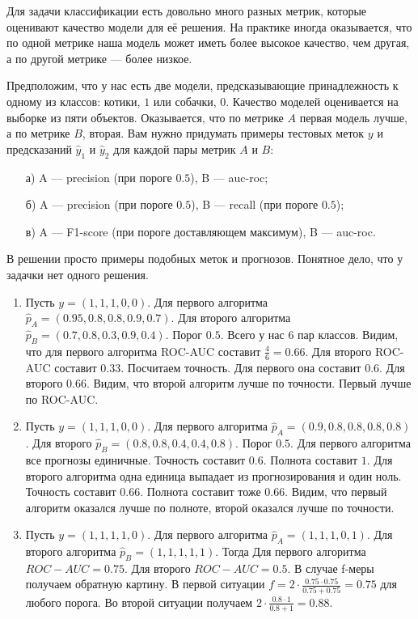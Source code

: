 \documentclass[12pt, a4paper, oneside]{article}
\theoremstyle{plain} %
\theoremstyle{definition}
\newcounter{problem}%
\renewcommand{\theproblem}{\arabic{problem}}
\newenvironment{problem}{
\addtocounter{problem}{1}\noindent{ \color{titleblue} \large \bfseries Упражнение~\theproblem \vspace{1ex} \newline}
}{ }
\begin{document}
\begin{problem}
Для задачи классификации есть довольно много разных метрик, которые оценивают качество модели для её решения. На практике иногда оказывается, что по одной метрике наша модель может иметь более высокое качество, чем другая, а по другой метрике --- более низкое. 

Предположим, что у нас есть две модели, предсказывающие принадлежность к одному из классов: котики, $1$ или собачки, $0$. Качество моделей оценивается на выборке из пяти объектов.  
Оказывается, что по метрике $A$ первая модель лучше, а по метрике $B$, вторая. Вам нужно придумать примеры тестовых меток $y$ и предсказаний $\hat y_1$ и $\hat y_2$ для каждой пары метрик $A$ и $B$: 

\begin{enumerate} 
\item[а)] A --- precision (при пороге $0.5$), B --- auc-roc;

\item[б)] A --- precision (при пороге $0.5$), B --- recall (при пороге $0.5$);

\item[в)] A --- F1-score (при пороге доставляющем максимум), B --- auc-roc.
\end{enumerate} 
\end{problem} 


\begin{solution} 
В решении просто примеры подобных меток и прогнозов. Понятное дело, что у задачки нет одного решения. 
\begin{enumerate}

	\item Пусть $y = (1,1,1,0,0)$. Для первого алгоритма $\hat p_A = (0.95, 0.8, 0.8, 0.9, 0.7)$. Для второго алгоритма $\hat p_B = (0.7, 0.8, 0.3, 0.9, 0.4)$. Порог $0.5$. Всего у нас $6$ пар классов. Видим, что для первого алгоритма ROC-AUC составит $\frac{4}{6} = 0.66$. Для второго ROC-AUC составит $0.33$.  Посчитаем точность. Для первого она составит $0.6$. Для второго $0.66$. Видим, что второй алгоритм лучше по точности. Первый лучше по ROC-AUC. 
	
	\item  Пусть $y = (1,1,1,0,0)$. Для первого алгоритма $\hat p_A = (0.9, 0.8, 0.8, 0.8, 0.8)$. Для второго $\hat p_B = (0.8,0.8,0.4,0.4,0.8)$.  Порог $0.5$. Для первого алгоритма все прогнозы единичные. Точность составит $0.6$. Полнота составит $1$. Для второго алгоритма одна единица выпадает из прогнозирования и один ноль. Точность составит $0.66$.  Полнота составит тоже $0.66$. Видим, что первый алгоритм оказался лучше по полноте, второй оказался лучше по точности.  
	
	\item  Пусть $y = (1,1,1,1,0)$. Для первого алгоритма $\hat p_A = (1,1,1,0,1)$. Для второго алгоритма $\hat p_B = (1,1,1,1,1)$. Тогда Для первого алгоритма $ROC-AUC = 0.75$. Для второго $ROC-AUC = 0.5$. В случае f-меры получаем обратную картину. В первой ситуации $f = 2 \cdot \frac{0.75 \cdot 0.75}{0.75 + 0.75} = 0.75$ для любого порога. Во второй ситуации получаем $2 \cdot \frac{0.8 \cdot 1}{0.8 + 1} =0.88$. 
\end{enumerate}
\end{solution}
\end{document}
